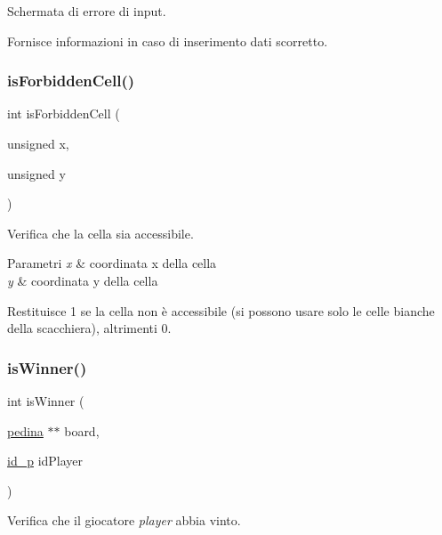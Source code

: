 Schermata di errore di input. 

Fornisce informazioni in caso di inserimento dati scorretto. \mbox{\label{group__Funzioni_ga5ffbe07c58992cdfe2f68ad35709829f}} 
\subsubsection{\texorpdfstring{is\+Forbidden\+Cell()}{isForbiddenCell()}}
{\footnotesize\ttfamily int is\+Forbidden\+Cell (\begin{DoxyParamCaption}\item[{unsigned}]{x,  }\item[{unsigned}]{y }\end{DoxyParamCaption})}



Verifica che la cella sia accessibile. 


\begin{DoxyParams}{Parametri}
{\em x} & coordinata x della cella \\
\hline
{\em y} & coordinata y della cella\\
\hline
\end{DoxyParams}
Restituisce 1 se la cella non è accessibile (si possono usare solo le celle bianche della scacchiera), altrimenti 0. \mbox{\label{group__Funzioni_ga0b5b57b74dd64318663e80224db22a29}} 
\subsubsection{\texorpdfstring{is\+Winner()}{isWinner()}}
{\footnotesize\ttfamily int is\+Winner (\begin{DoxyParamCaption}\item[{\hyperlink{ml__lib_8h_a71fee95122b31f5cb0b07d9c16ffa3a5}{pedina} $\ast$$\ast$}]{board,  }\item[{\hyperlink{ml__lib_8h_a0330ff92cbc796e96c3ce3e4401bf1e1}{id\+\_\+p}}]{id\+Player }\end{DoxyParamCaption})}



Verifica che il giocatore {\itshape player} abbia vinto. 


